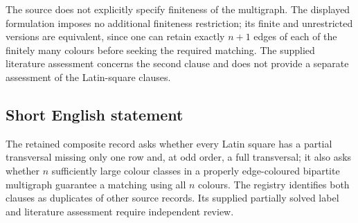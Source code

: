 \documentclass[11pt]{article}
\begin{document}
The source does not explicitly specify finiteness of the multigraph. The displayed formulation imposes no additional finiteness restriction; its finite and unrestricted versions are equivalent, since one can retain exactly \(n+1\) edges of each of the finitely many colours before seeking the required matching. The supplied literature assessment concerns the second clause and does not provide a separate assessment of the Latin-square clauses.
\subsection{Short English statement}
The retained composite record asks whether every Latin square has a partial transversal missing only one row and, at odd order, a full transversal; it also asks whether \(n\) sufficiently large colour classes in a properly edge-coloured bipartite multigraph guarantee a matching using all \(n\) colours. The registry identifies both clauses as duplicates of other source records. Its supplied partially solved label and literature assessment require independent review.
\end{document}

